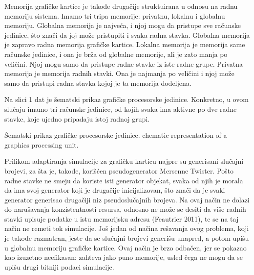 Memorija grafičke kartice je takođe drugačije struktuirana u odnosu na radnu memoriju sistema. Imamo tri tripa memorije: privatnu, lokalnu i globalnu memoriju. Globalna memorija je najveća, i njoj mogu da pristupe sve računske jedinice, što znači da joj može pristupiti i svaka radna stavka. Globalna memorija je zapravo radna memorija grafičke kartice. Lokalna memorija je memorija same računske jedinice, i ona je brža od globalne memorije, ali je zato manja po veličini. Njoj mogu samo da pristupe radne stavke iz iste radne grupe. Privatna memorija je memorija radnih stavki. Ona je najmanja po veličini i njoj može samo da pristupi radna stavka kojoj je ta memorija dodeljena.

Na slici 1 dat je šematski prikaz grafičke procesorske jedinice. Konkretno, u ovom slučaju imamo tri računske jedinice, od kojih svaka ima aktivne po dve radne stavke, koje ujedno pripadaju istoj radnoj grupi.

    {Šematski prikaz grafičke procesorske jedinice.}
    {chematic representation of a graphics processing unit.}

Prilikom adaptiranja simulacije za grafičku karticu najpre su generisani slučajni brojevi, za šta je, takođe, korišćen pseudogenerator Mersenne Twister. Pošto radne stavke ne smeju da koriste isti generator objekat, svaka od njih je morala da ima svoj generator koji je drugačije inicijalizovan, što znači da je svaki generator generisao drugačiji niz pseudoslučajnih brojeva. Na ovaj način ne dolazi do narušavanja konzistentnosti resursa, odnosno ne može se desiti da više radnih stavki upisuje podatke u istu memorijsku adresu (Feautrier 2011), te se na taj način ne remeti tok simulacije. Još jedan od načina rešavanja ovog problema, koji je takođe razmatran, jeste da se slučajni brojevi generišu unapred, a potom upišu u globalnu memoriju grafičke kartice. Ovaj način je brzo odbačen, jer se pokazao kao izuzetno neefikasan: zahteva jako puno memorije, usled čega ne mogu da se upišu drugi bitniji podaci simulacije.

